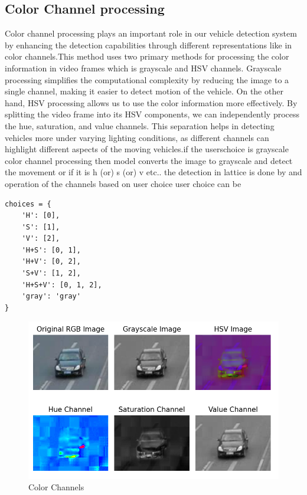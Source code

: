 \documentclass[conference]{IEEEtran}
\begin{document}
\subsection{Color Channel processing}
Color channel processing plays an important role in our vehicle detection system by enhancing the detection capabilities through different representations like in color channels.This method uses two primary methods for processing the color information in video frames which is grayscale and HSV channels. Grayscale processing simplifies the computational complexity by reducing the image to a single channel, making it easier to detect motion of the vehicle. On the other hand, HSV processing allows us to use the color information more effectively. By splitting the video frame into its HSV components, we can independently process the hue, saturation, and value channels. This separation helps in detecting vehicles more under varying lighting conditions, as different channels can highlight different aspects of the moving vehicles.if the userschoice is grayscale color channel processing then model converts the image to grayscale and detect the movement or if it is h (or) s (or) v etc.. the detection in lattice is done by and operation of the channels based on user choice user choice can be
\begin{verbatim}
choices = {
    'H': [0],
    'S': [1],
    'V': [2],
    'H+S': [0, 1],
    'H+V': [0, 2],
    'S+V': [1, 2],
    'H+S+V': [0, 1, 2],
    'gray': 'gray'
}
\end{verbatim}

\begin{figure}[h]
    \centering
    \includegraphics[width=0.8\linewidth]{color channels.png}
    \caption{Color Channels}
    \label{fig:enter-label}
\end{figure}
\end{document}
